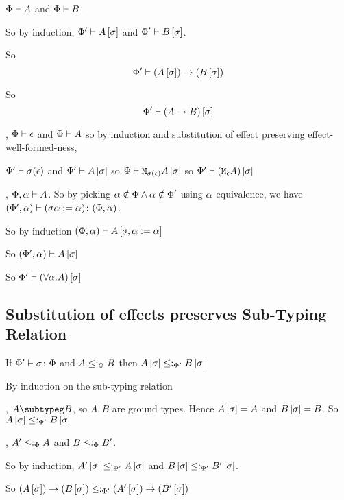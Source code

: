 {    

    \bi $\Phi\vdash A$ and $\Phi\vdash B$.

    So by induction, $\Phi'\vdash A\left[\sigma\right]$ and $\Phi'\vdash B\left[\sigma\right]$.

    So \begin{equation}
        \Phi'\vdash (A\left[\sigma\right])\rightarrow (B\left[\sigma\right])
    \end{equation}

    So \begin{equation}
        \Phi'\vdash (A\rightarrow B)\left[\sigma\right]
    \end{equation}

    


    \bi, $\Phi\vdash \epsilon$ and $\Phi\vdash A$ so by induction and substitution of effect preserving effect-well-formed-ness, 

    $\Phi'\vdash \sigma(\epsilon)$ and $\Phi'\vdash A\left[\sigma\right]$ so $\Phi\vdash \texttt{M}_{\sigma(\epsilon)}{A\left[\sigma\right]}$ so $\Phi'\vdash (\texttt{M}_{\epsilon}{A})\left[\sigma\right]$

    \bi, $\Phi,\alpha\vdash A$. So by picking $\alpha\notin\Phi\wedge\alpha\notin\Phi'$ using $\alpha$-equivalence, we have $(\Phi',\alpha) \vdash (\sigma\alpha:=\alpha) \colon (\Phi,\alpha)$.

    So by induction $(\Phi, \alpha)\vdash A\left[\sigma,\alpha:=\alpha\right]$

    So $(\Phi',\alpha)\vdash A\left[\sigma\right]$

    So $\Phi'\vdash (\forall \alpha. A)\left[\sigma\right]$

    \subsection{Substitution of effects preserves Sub-Typing Relation}

    If $\Phi' \vdash \sigma \colon \Phi$ and $A\leq:_\Phi B$ then $A\left[\sigma\right]\leq:_{\Phi'} B\left[\sigma\right]$

    \proof
    By induction on the sub-typing relation

    \bi, $A\subtypeg B$, so $A, B$ are ground types.
    Hence $A\left[\sigma\right] = A$ and $B\left[\sigma\right] = B$.
    So $A\left[\sigma\right]\leq:_{\Phi'} B\left[\sigma\right]$

    \bi, $A'\leq:_\Phi A$ and $B\leq:_\Phi B'$.
    
    So by induction, $A'\left[\sigma\right]\leq:_{\Phi'} A\left[\sigma\right]$ and $B\left[\sigma\right]\leq:_{\Phi'} B'\left[\sigma\right]$.

    So $(A\left[\sigma\right])\rightarrow (B\left[\sigma\right])\leq:_{\Phi'} (A'\left[\sigma\right])\rightarrow (B'\left[\sigma\right])$

}
